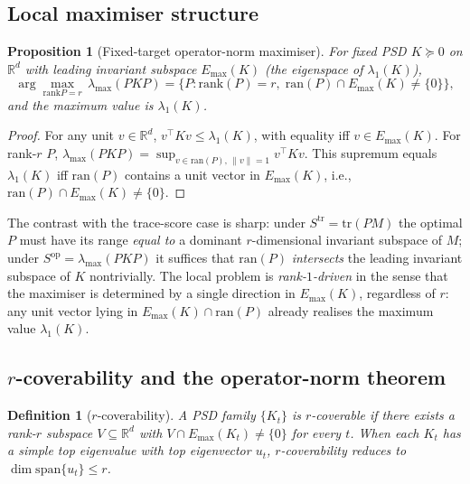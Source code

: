 \documentclass[final,3p,times]{elsarticle}
\newtheorem{proposition}[theorem]{Proposition}
\newtheorem{definition}[theorem]{Definition}
\newcommand{\tr}{\mathrm{tr}}
\newcommand{\R}{\mathbb{R}}
\newcommand{\rank}{\mathrm{rank}}
\newcommand{\ran}{\mathrm{ran}}
\newcommand{\Emax}{E_{\max}}
\begin{document}
\subsection{Local maximiser structure}

\begin{proposition}[Fixed-target operator-norm maximiser]\label{prop:localmax}
For fixed PSD $K\succeq 0$ on $\R^d$ with leading invariant subspace
$\Emax(K)$ (the eigenspace of $\lambda_1(K)$),
\begin{equation}\label{eq:localmax}
\arg\max_{\rank P=r}\,\lambda_{\max}(P K P)
=\bigl\{P:\rank(P)=r,\;\ran(P)\cap\Emax(K)\ne\{0\}\bigr\},
\end{equation}
and the maximum value is $\lambda_1(K)$.
\end{proposition}

\begin{proof}
For any unit $v\in\R^d$, $v^\top K v\le\lambda_1(K)$, with equality iff
$v\in\Emax(K)$.
For rank-$r$ $P$,
$\lambda_{\max}(PKP)=\sup_{v\in\ran(P),\,\|v\|=1}v^\top K v$.
This supremum equals $\lambda_1(K)$ iff $\ran(P)$ contains a unit vector
in $\Emax(K)$, i.e., $\ran(P)\cap\Emax(K)\ne\{0\}$.
\end{proof}

The contrast with the trace-score case is sharp: under
$S^{\mathrm{tr}}=\tr(PM)$ the optimal $P$ must have its range
\emph{equal to} a dominant $r$-dimensional invariant subspace of $M$;
under $S^{\mathrm{op}}=\lambda_{\max}(PKP)$ it suffices that
$\ran(P)$ \emph{intersects} the leading invariant subspace of $K$
nontrivially.
The local problem is \emph{rank-$1$-driven} in the sense that the
maximiser is determined by a single direction in $\Emax(K)$, regardless
of $r$: any unit vector lying in $\Emax(K)\cap\ran(P)$ already realises
the maximum value $\lambda_1(K)$.

\subsection{\texorpdfstring{$r$}{r}-coverability and the operator-norm theorem}

\begin{definition}[$r$-coverability]\label{def:cov}
A PSD family $\{K_t\}$ is \emph{$r$-coverable} if there exists a rank-$r$
subspace $V\subseteq\R^d$ with $V\cap\Emax(K_t)\ne\{0\}$ for every $t$.
When each $K_t$ has a simple top eigenvalue with top eigenvector $u_t$,
$r$-coverability reduces to $\dim\mathrm{span}\{u_t\}\le r$.
\end{definition}
\end{document}
